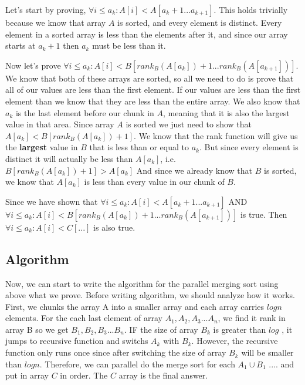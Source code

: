 \documentclass[11pt]{article}
\begin{document}
Let's start by proving, $\forall i \leq a_k : A[i] < A[a_k+1 ... a_{k+1}]$. This holds trivially because we know that array $A$ is sorted, and every element is distinct. Every element in a sorted array is less than the elements after it, and since our array starts at $a_k+1$ then $a_k$ must be less than it.

Now let's prove $\forall i \leq a_k : A[i] < B[rank_B(A[a_k])+1 ... rank_B(A[a_{k+1}])]$. We know that both of these arrays are sorted, so all we need to do is prove that all of our values are less than the first element. If our values are less than the first element than we know that they are less than the entire array. We also know that $a_k$ is the last element before our chunk in $A$, meaning that it is also the largest value in that area. Since array $A$ is sorted we just need to show that $A[a_k] < B[rank_B(A[a_k])+1]$. We know that the rank function will give us the \textbf{largest} value in $B$ that is less than or equal to $a_k$. But since every element is distinct it will actually be less than $A[a_k]$, i.e. $B[rank_B(A[a_k])+1] > A[a_k]$  And since we already know that $B$ is sorted, we know that $A[a_k]$ is less than every value in our chunk of $B$.

Since we have shown that $\forall i \leq a_k : A[i] < A[a_k+1 ... a_{k+1}]$ AND $\forall i \leq a_k : A[i] < B[rank_B(A[a_k])+1 ... rank_B(A[a_{k+1}])]$ is true. Then $\forall i \leq a_k : A[i] < C[...]$ is also true.

\subsection{Algorithm}
Now, we can start to write the algorithm for the parallel merging sort using above what we prove.
Before writing algorithm, we should analyze how it works.  First, we chunks the array A into a smaller array and each array carries $logn$ elements.  For the each last element of array $A_1, A_2, A_3 ... A_n$,  we find it rank in array B so we get $B_1, B_2, B_3 ... B_n$.  IF the size of array $B_k$ is greater than $log$ , it jumps to recursive function and switchs $A_k$ with $B_k$.  However, the recursive function only runs once since after switching the size of array $B_k$ will be smaller than $logn$. Therefore, we can parallel do the merge sort for each $A_1 \cup B_1$ .... and put in array $C$ in order.  The $C$ array is the final answer. 
\end{document}
